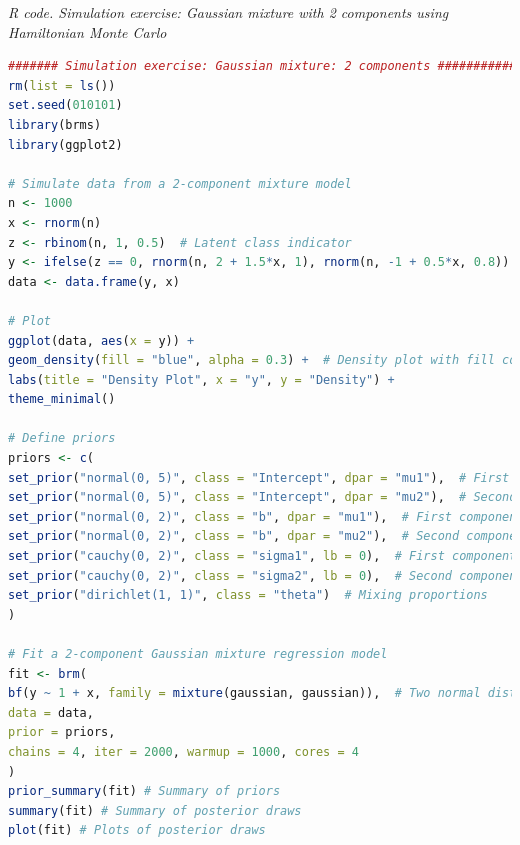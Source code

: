 \begin{tcolorbox}[enhanced,width=4.67in,center upper,
	fontupper=\large\bfseries,drop shadow southwest,sharp corners]
	\textit{R code. Simulation exercise: Gaussian mixture with 2 components using Hamiltonian Monte Carlo}
	\begin{VF}
		\begin{lstlisting}[language=R]
####### Simulation exercise: Gaussian mixture: 2 components #############
rm(list = ls())
set.seed(010101)
library(brms)
library(ggplot2)

# Simulate data from a 2-component mixture model
n <- 1000
x <- rnorm(n)
z <- rbinom(n, 1, 0.5)  # Latent class indicator
y <- ifelse(z == 0, rnorm(n, 2 + 1.5*x, 1), rnorm(n, -1 + 0.5*x, 0.8))
data <- data.frame(y, x)

# Plot
ggplot(data, aes(x = y)) +
geom_density(fill = "blue", alpha = 0.3) +  # Density plot with fill color
labs(title = "Density Plot", x = "y", y = "Density") +
theme_minimal()

# Define priors
priors <- c(
set_prior("normal(0, 5)", class = "Intercept", dpar = "mu1"),  # First component intercept
set_prior("normal(0, 5)", class = "Intercept", dpar = "mu2"),  # Second component intercept
set_prior("normal(0, 2)", class = "b", dpar = "mu1"),  # First component slope
set_prior("normal(0, 2)", class = "b", dpar = "mu2"),  # Second component slope
set_prior("cauchy(0, 2)", class = "sigma1", lb = 0),  # First component sigma
set_prior("cauchy(0, 2)", class = "sigma2", lb = 0),  # Second component sigma
set_prior("dirichlet(1, 1)", class = "theta")  # Mixing proportions
)

# Fit a 2-component Gaussian mixture regression model
fit <- brm(
bf(y ~ 1 + x, family = mixture(gaussian, gaussian)),  # Two normal distributions
data = data,
prior = priors,
chains = 4, iter = 2000, warmup = 1000, cores = 4
)
prior_summary(fit) # Summary of priors
summary(fit) # Summary of posterior draws
plot(fit) # Plots of posterior draws
		\end{lstlisting}
	\end{VF}
\end{tcolorbox}


